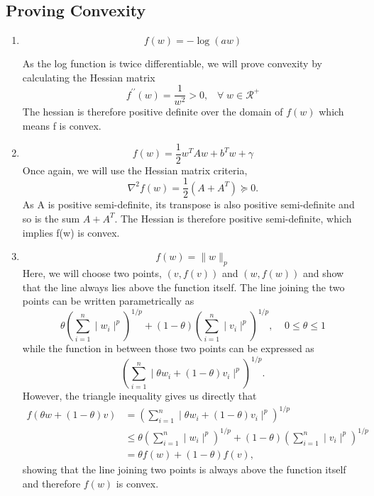 \subsection{Proving Convexity}
\begin{enumerate}
\item\begin{equation}
f(w) = -\log(aw)
\end{equation}
\par As the log function is twice differentiable, we will prove convexity by calculating the Hessian matrix
\begin{equation}
f^{\prime\prime}(w) = \frac{1}{w^{2}}> 0,\;\;\; \forall\; w\in \mathcal{R}^{+}
\end{equation}
The hessian is therefore positive definite over the domain of $f(w)$ which means f is convex.

\par\item\begin{equation}
f(w) = \frac{1}{2}w^{T}Aw+b^{T}w+\gamma
\end{equation}
Once again, we will use the Hessian matrix criteria,
\begin{equation}
\nabla^{2}f(w) = \frac{1}{2}\left(A+A^{T}\right)\succeq 0.
\end{equation}
As A is positive semi-definite, its transpose is also positive semi-definite and so is the sum $A+A^{T}$.  The Hessian is therefore positive semi-definite, which implies f(w) is convex.

\par\item\begin{equation}
f(w) = \|w \|_{p}
\end{equation}
Here, we will choose two points, $(v,f(v))$ and $(w,f(w))$ and show that the line always lies above the function itself. The line joining the two points can be written parametrically as
\begin{equation}
\theta\left(\sum_{i=1}^{n}\mid w_{i}\mid^{p}\right)^{1/p}+(1-\theta)\left(\sum_{i=1}^{n}\mid v_{i}\mid^{p}\right)^{1/p},\;\;\;\; 0\le\theta \le 1
\end{equation}
while the function in between those two points can be expressed as
\begin{equation}
\left(\sum_{i=1}^{n}\mid \theta w_{i}+(1-\theta)v_{i}\mid^{p}\right)^{1/p}.
\end{equation}
However, the triangle inequality gives us directly that
\begin{align}
f(\theta w+(1-\theta)v)&=\left(\sum_{i=1}^{n}\mid \theta w_{i}+(1-\theta)v_{i}\mid^{p}\right)^{1/p}\\
&\le \theta\left(\sum_{i=1}^{n}\mid w_{i}\mid^{p}\right)^{1/p}+(1-\theta)\left(\sum_{i=1}^{n}\mid v_{i}\mid^{p}\right)^{1/p}\nonumber\\
&=\theta f(w)+(1-\theta)f(v)\nonumber,
\end{align}
showing that the line joining two points is always above the function itself and therefore $f(w)$ is convex.


\end{enumerate}

